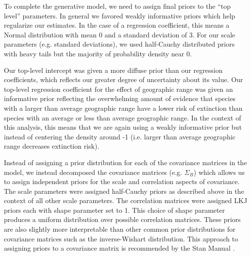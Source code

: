 \documentclass[12pt,letterpaper]{article}
\begin{document}
\begin{refsection}
To complete the generative model, we need to assign final priors to the ``top level'' parameters. In general we favored weakly informative priors which help regularize our estimates. In the case of a regression coefficient, this means a Normal distribution with mean 0 and a standard deviation of 3. For our scale parameters (e.g. standard deviations), we used half-Cauchy distributed priors with heavy tails but the majority of probability density near 0.

Our top-level intercept was given a more diffuse prior than our regression coefficients, which reflects our greater degree of uncertainty about its value. Our top-level regression coefficient for the effect of geographic range was given an informative prior reflecting the overwhelming amount of evidence that species with a larger than average geographic range have a lower risk of extinction than species with an average or less than average geographic range. In the context of this analysis, this means that we are again using a weakly informative prior but instead of centering the density around -1 (i.e. larger than average geographic range decreases extinction risk).

Instead of assigning a prior distribution for each of the covariance matrices in the model, we instead decomposed the covariance matrices (e.g. \(\Sigma_{B}\)) which allows us to assign independent priors for the scale and correlation aspects of covariance. The scale parameters were assigned half-Cauchy priors as described above in the context of all other scale parameters. The correlation matrices were assigned LKJ priors each with shape parameter set to 1. This choice of shape parameter produces a uniform distribution over possible correlation matrices. These priors are also slightly more interpretable than other common prior distributions for covariance matrices such as the inverse-Wishart distribution. This approach to assigning priors to a covariance matrix is recommended by the Stan Manual \citep{StanManual}.


\end{refsection}
\end{document}
